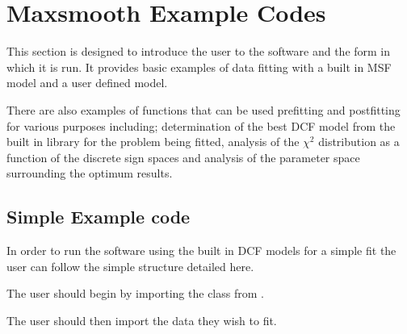 \documentclass[letterpaper,10pt,english]{sphinxmanual}
\begin{document}
\chapter{Maxsmooth Example Codes}
\label{\detokenize{source/maxsmooth:maxsmooth-example-codes}}\label{\detokenize{source/maxsmooth::doc}}
This section is designed to introduce the user to the software and the form
in which it is run. It provides basic examples of data fitting with a built in
MSF model and a user defined model.

There are also examples of functions that can be used pre\sphinxhyphen{}fitting and post\sphinxhyphen{}fitting
for various purposes including; determination of the best DCF model from the
built in library for the problem being fitted, analysis of the \({\chi^2}\)
distribution as a function of the discrete sign spaces and analysis of the
parameter space surrounding the optimum results.


\section{Simple Example code}
\label{\detokenize{source/maxsmooth:simple-example-code}}
In order to run the  software using the built
in DCF models for a simple fit the user can follow the simple structure detailed here.

The user should begin by importing the  class from .

\begin{sphinxVerbatim}[commandchars=\\\{\}]
   
\end{sphinxVerbatim}

The user should then import the data they wish to fit.

\begin{sphinxVerbatim}[commandchars=\\\{\}]
   

  
  
\end{sphinxVerbatim}
\end{document}
